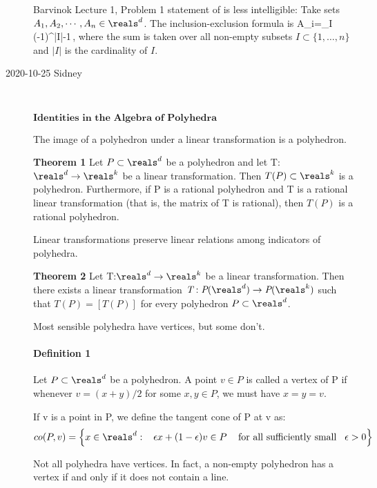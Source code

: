 \begin{description}
Barvinok Lecture 1, Problem 1 statement of
 is less intelligible: Take sets $A_1, A_2,\cdots,
A_n\in\reals^d$. The inclusion-exclusion formula is
\beq
\cup A_i=\sum_I (-1)^{|I|-1}
\,,
where the sum is taken over all non-empty subsets
$I\subset \{1,\dots, n\}$
and $|I|$ is the cardinality of $I$.



\item[2020-10-25 Sidney]~

$\textbf{Identities in the Algebra of Polyhedra}$

The image of a polyhedron under a linear transformation is a polyhedron.

\textbf{Theorem 1}
Let $P\subset\reals^d$ be a polyhedron and let
T:$\reals^d\rightarrow\reals^k$ be a linear transformation. Then
$T(P)\subset\reals^k$ is a polyhedron. Furthermore, if P is a rational
polyhedron and T is a rational linear transformation (that is, the matrix
of T is rational), then $T(P)$ is a rational polyhedron.

Linear transformations preserve linear relations among indicators of polyhedra.

\textbf{Theorem 2}
Let T:$\reals^d\rightarrow\reals^k$ be a linear transformation. Then
there exists a linear transformation
$\textit{T}:\textit{P}(\reals^d)\rightarrow\textit{P}(\reals^k)$ such
that $\textit{T}(P)=[T(P)]$ for every polyhedron $P\subset\reals^d$.

Most sensible polyhedra have vertices, but some don't.

\paragraph{Definition  1} Let $P\subset\reals^d$ be a polyhedron.
A point $v\in P$ is called a vertex of P if whenever $v=(x+y)/2$ for some
$x,y\in P$, we must have $x=y=v$.

If v is a point in P, we define the tangent cone of P at v as:
$$
co(P,v)=\left\lbrace x\in\reals^d:
   \hspace{3mm} \epsilon x+(1-\epsilon)v\in P \hspace{3mm}
   \mbox{ for all sufficiently small} \hspace{3mm}\epsilon>0\right\rbrace
$$

Not all polyhedra have vertices. In fact, a non-empty polyhedron has a
vertex if and only if it does not contain a line.


\end{description}
